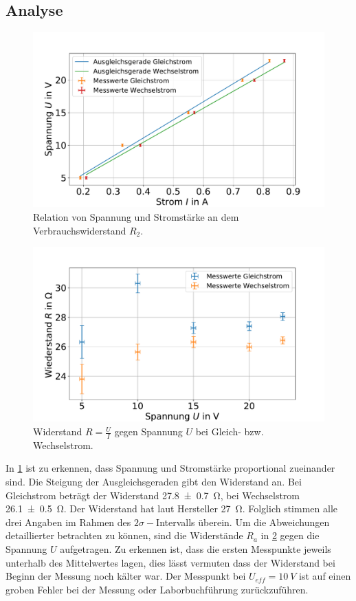 \subsection{Analyse} 



\begin{figure}[h]
	\centering
	\includegraphics[width=0.9\linewidth]{"auswertung/Auswertung Innenwiderstand/Widerstand R2 B"}
	\caption{Relation von Spannung und Stromstärke an dem Verbrauchswiderstand $R_2$.}
	\label{fig:widerstand-r2}
\end{figure}



\begin{figure}[h]
	\centering
	\includegraphics[width=0.9\linewidth]{"auswertung/Auswertung Innenwiderstand/WiderstandR2 A"}
	\caption{Widerstand $R=\frac{U}{I}$ gegen Spannung $U$ bei Gleich- bzw. Wechselstrom.}
	\label{fig:widerstandr2-a}
\end{figure}


In \cref{fig:widerstand-r2} ist zu erkennen, dass Spannung und Stromstärke proportional zueinander sind. Die Steigung der Ausgleichsgeraden gibt den Widerstand an. Bei Gleichstrom beträgt der Widerstand \SI{27.8+-0.7}{\ohm}, bei Wechselstrom \SI{26.1+- 0.5}{\ohm}. Der Widerstand hat laut Hersteller \SI{27}{\ohm}. Folglich stimmen alle drei Angaben im Rahmen des $2\sigma-$Intervalls überein. Um die Abweichungen detaillierter betrachten zu können, sind die Widerstände $R_a$ in \cref{fig:widerstandr2-a} gegen die Spannung $U$ aufgetragen. Zu erkennen ist, dass die ersten Messpunkte jeweils unterhalb des Mittelwertes lagen, dies lässt vermuten dass der Widerstand bei Beginn der Messung noch kälter war. Der Messpunkt bei  $U_{eff}= \SI{10}{V}$ ist auf einen groben Fehler bei der Messung oder Laborbuchführung zurückzuführen.\\


